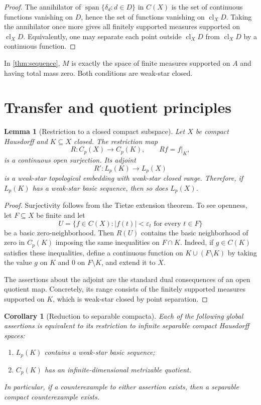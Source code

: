 \documentclass[11pt]{article}
\newtheorem{lemma}[theorem]{Lemma}
\newtheorem{corollary}[theorem]{Corollary}
\newcommand{\Cp}{C_p}
\newcommand{\Lp}{L_p}
\newcommand{\spann}{\operatorname{span}}
\newcommand{\cl}{\operatorname{cl}}
\begin{document}
\begin{proof}
The annihilator of $\spann\{\delta_d:d\in D\}$ in $C(X)$ is the set of
continuous functions vanishing on $D$, hence the set of functions vanishing on
$\cl_XD$.  Taking the annihilator once more gives all finitely supported
measures supported on $\cl_XD$.  Equivalently, one may separate each point
outside $\cl_XD$ from $\cl_XD$ by a continuous function.
\end{proof}

In \cref{thm:sequence}, $M$ is exactly the space of finite measures supported
on $A$ and having total mass zero.  Both conditions are weak-star closed.

\section{Transfer and quotient principles}

\begin{lemma}[Restriction to a closed compact subspace]\label{lem:restriction}
Let $X$ be compact Hausdorff and $K\subseteq X$ closed.  The restriction map
\[
 R:\Cp(X)\longrightarrow\Cp(K),\qquad Rf=f|_K,
\]
is a continuous open surjection.  Its adjoint
\[
 R':\Lp(K)\longrightarrow\Lp(X)
\]
is a weak-star topological embedding with weak-star closed range.  Therefore,
if $\Lp(K)$ has a weak-star basic sequence, then so does $\Lp(X)$.
\end{lemma}

\begin{proof}
Surjectivity follows from the Tietze extension theorem.  To see openness, let
$F\subseteq X$ be finite and let
\[
 U=\{f\in C(X): |f(t)|<\varepsilon_t\text{ for every }t\in F\}
\]
be a basic zero-neighborhood.  Then $R(U)$ contains the basic neighborhood of
zero in $\Cp(K)$ imposing the same inequalities on $F\cap K$.  Indeed, if
$g\in C(K)$ satisfies these inequalities, define a continuous function on
$K\cup(F\setminus K)$ by taking the value $g$ on $K$ and $0$ on
$F\setminus K$, and extend it to $X$.

The assertions about the adjoint are the standard dual consequences of an
open quotient map.  Concretely, its range consists of the finitely supported
measures supported on $K$, which is weak-star closed by point separation.
\end{proof}

\begin{corollary}[Reduction to separable compacta]\label{cor:separable-reduction}
Each of the following global assertions is equivalent to its restriction to
infinite separable compact Hausdorff spaces:
\begin{enumerate}[label=\textup{(\alph*)}]
\item $\Lp(K)$ contains a weak-star basic sequence;
\item $\Cp(K)$ has an infinite-dimensional metrizable quotient.
\end{enumerate}
In particular, if a counterexample to either assertion exists, then a
separable compact counterexample exists.
\end{corollary}
\end{document}
